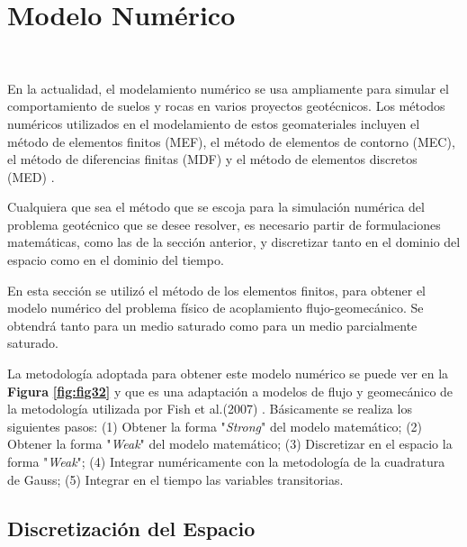


\section{Modelo Numérico}~\hypertarget{sec:sec340}{}
\label{sec:sec340}

En la actualidad, el modelamiento numérico se usa ampliamente para simular el comportamiento de suelos y rocas en varios proyectos geotécnicos. Los métodos numéricos utilizados en el modelamiento de estos geomateriales incluyen el método de elementos finitos (MEF), el método de elementos de contorno (MEC), el método de diferencias finitas (MDF) y el método de elementos discretos (MED) \cite{Li2018RockboltingApplications}.\bigskip 

Cualquiera que sea el método que se escoja para la simulación numérica del problema geotécnico que se desee resolver, es necesario partir de formulaciones matemáticas, como las de la sección anterior, y discretizar tanto en el dominio del espacio como en el dominio del tiempo.\bigskip

En esta sección se utilizó el método de los elementos finitos, para obtener el modelo numérico del problema físico de acoplamiento flujo-geomecánico. Se obtendrá tanto para un medio saturado como para un medio parcialmente saturado.\bigskip

La metodología adoptada para obtener este modelo numérico se puede ver en la \textbf{Figura} \textbf{\ref{fig:fig32}} y que es una adaptación a modelos de flujo y geomecánico de la metodología utilizada por Fish et al.(2007) \cite{Fish2007AElements}. Básicamente se realiza los siguientes pasos: (1) Obtener la forma "\textit{Strong}" del modelo matemático; (2) Obtener la forma "\textit{Weak}" del modelo matemático; (3) Discretizar en el espacio la forma "\textit{Weak}"; (4) Integrar numéricamente con la metodología de la cuadratura de Gauss; (5) Integrar en el tiempo las variables transitorias.\bigskip

\newpage


\subsection{Discretización del Espacio}~\hypertarget{sec:sec341}{}
\label{sec:sec341}

